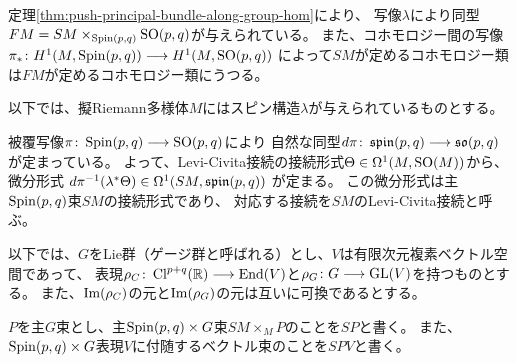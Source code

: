 \begin{rem}
  定理\ref{thm:push-principal-bundle-along-group-hom}により、
  写像$\lambda$により同型$FM = SM \times_{\operatorname{Spin}(p,q)} \operatorname{SO}(p,q)$が与えられている。
  また、コホモロジー間の写像$\pi_* \colon H^1(M,\operatorname{Spin}(p,q))\longrightarrow H^1(M,\operatorname{SO}(p,q))$
  によって$SM$が定めるコホモロジー類は$FM$が定めるコホモロジー類にうつる。
\end{rem}

以下では、擬Riemann多様体$M$にはスピン構造$\lambda$が与えられているものとする。

\begin{dfn}
  \label{dfn:Levi-Civita-on-spinor-bundle}
  被覆写像$\pi\colon \operatorname{Spin}(p,q)\longrightarrow \operatorname{SO}(p,q)$により
  自然な同型$d\pi\colon\operatorname{\mathfrak{s}\mathfrak{p}\mathfrak{i}\mathfrak{n}}(p,q) \longrightarrow \operatorname{\mathfrak{s}\mathfrak{o}}(p,q)$が定まっている。
  よって、Levi-Civita接続の接続形式$\Theta\in\Omega^1(M,\operatorname{SO}(M))$から、
  微分形式
  $d\pi^{-1}(\lambda^*\Theta)\in\Omega^1(SM,\operatorname{\mathfrak{s}\mathfrak{p}\mathfrak{i}\mathfrak{n}}(p,q))$
  が定まる。
  この微分形式は主$\operatorname{Spin}(p,q)$束$SM$の接続形式であり、
  対応する接続を$SM$のLevi-Civita接続と呼ぶ。
\end{dfn}

以下では、$G$をLie群（ゲージ群と呼ばれる）とし、$V$は有限次元複素ベクトル空間であって、
表現$\rho_C\colon\operatorname{Cl}^{p+q}(\mathbb{R})\longrightarrow\operatorname{End}(V)$と$\rho_G\colon G\longrightarrow\operatorname{GL}(V)$を持つものとする。
また、$\operatorname{Im}(\rho_C)$の元と$\operatorname{Im}(\rho_G)$の元は互いに可換であるとする。

$P$を主$G$束とし、主$\operatorname{Spin}(p,q)\times G$束$SM\times_MP$のことを$SP$と書く。
また、$\operatorname{Spin}(p,q)\times G$表現$V$に付随するベクトル束のことを$SPV$と書く。

